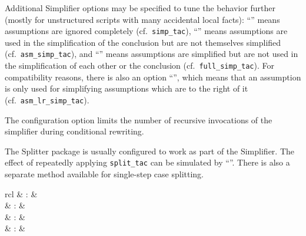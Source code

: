 \begin{isabellebody}
\begin{isamarkuptext}
  Additional Simplifier options may be specified to tune the behavior
  further (mostly for unstructured scripts with many accidental local
  facts): ``'' means assumptions are ignored
  completely (cf.\ \verb|simp_tac|), ``'' means
  assumptions are used in the simplification of the conclusion but are
  not themselves simplified (cf.\ \verb|asm_simp_tac|), and ``'' means assumptions are simplified but are not used
  in the simplification of each other or the conclusion (cf.\ \verb|full_simp_tac|).  For compatibility reasons, there is also an option
  ``'', which means that an assumption is only used
  for simplifying assumptions which are to the right of it (cf.\ \verb|asm_lr_simp_tac|).

  The configuration option  limits the number of
  recursive invocations of the simplifier during conditional
  rewriting.

  \medskip The Splitter package is usually configured to work as part
  of the Simplifier.  The effect of repeatedly applying \verb|split_tac| can be simulated by ``''.  There is also a separate 
  method available for single-step case splitting.%
\end{isamarkuptext}%
\isamarkuptrue%
%
\isamarkuptrue%
%
\begin{isamarkuptext}%
\begin{matharray}{rcl}
    \hypertarget{command.print-simpset}{\hyperlink{command.print-simpset}{\mbox{}}}\isa{{\isachardoublequote}\isactrlsup {\isacharasterisk}{\isachardoublequote}} & : &  \\
    \hypertarget{attribute.simp}{\hyperlink{attribute.simp}{\mbox{}}} & : & \isaratt \\
    \hypertarget{attribute.cong}{\hyperlink{attribute.cong}{\mbox{}}} & : & \isaratt \\
    \hypertarget{attribute.split}{\hyperlink{attribute.split}{\mbox{}}} & : & \isaratt \\
  \end{matharray}


\end{isamarkuptext}
\end{isabellebody}
